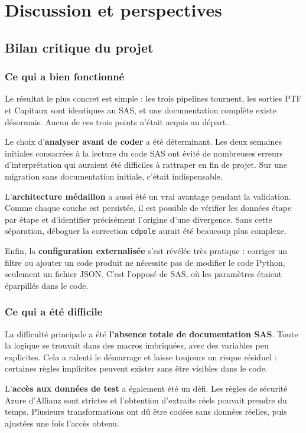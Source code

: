 \chapter{Discussion et perspectives} 

\section{Bilan critique du projet}

\subsection*{Ce qui a bien fonctionné}

Le résultat le plus concret est simple : les trois pipelines tournent, les sorties PTF et Capitaux sont identiques au SAS, et une documentation complète existe désormais. Aucun de ces trois points n’était acquis au départ.

Le choix d’\textbf{analyser avant de coder} a été déterminant. Les deux semaines initiales consacrées à la lecture du code SAS ont évité de nombreuses erreurs d’interprétation qui auraient été difficiles à rattraper en fin de projet. Sur une migration sans documentation initiale, c’était indispensable.

L’\textbf{architecture médaillon} a aussi été un vrai avantage pendant la validation. Comme chaque couche est persistée, il est possible de vérifier les données étape par étape et d’identifier précisément l’origine d’une divergence. Sans cette séparation, déboguer la correction \texttt{cdpole} aurait été beaucoup plus complexe.

Enfin, la \textbf{configuration externalisée} s’est révélée très pratique : corriger un filtre ou ajouter un code produit ne nécessite pas de modifier le code Python, seulement un fichier JSON. C’est l’opposé de SAS, où les paramètres étaient éparpillés dans le code.

\subsection*{Ce qui a été difficile}

La difficulté principale a été \textbf{l’absence totale de documentation SAS}. Toute la logique se trouvait dans des macros imbriquées, avec des variables peu explicites. Cela a ralenti le démarrage et laisse toujours un risque résiduel : certaines règles implicites peuvent exister sans être visibles dans le code.

L’\textbf{accès aux données de test} a également été un défi. Les règles de sécurité Azure d’Allianz sont strictes et l’obtention d’extraits réels pouvait prendre du temps. Plusieurs transformations ont dû être codées sans données réelles, puis ajustées une fois l’accès obtenu.

